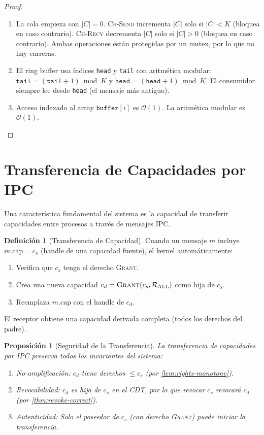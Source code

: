 \documentclass[11pt,twoside,openright]{book}
\theoremstyle{definition}
\newtheorem{definition}{Definición}[chapter]
\theoremstyle{plain}
\newtheorem{proposition}[theorem]{Proposición}
\theoremstyle{remark}
\newcommand{\bigO}{\mathcal{O}}
\newcommand{\rights}{\mathcal{R}}
\newcommand{\rightsall}{\rights_{\mathrm{ALL}}}
\begin{document}
\begin{proof}
\leavevmode
\begin{enumerate}
    \item La cola empieza con $|C| = 0$. \textsc{Ch-Send} incrementa $|C|$ solo si
          $|C| < K$ (bloquea en caso contrario). \textsc{Ch-Recv} decrementa $|C|$ solo
          si $|C| > 0$ (bloquea en caso contrario). Ambas operaciones están protegidas
          por un mutex, por lo que no hay carreras.
    \item El ring buffer usa índices \texttt{head} y \texttt{tail} con aritmética modular:
          $\texttt{tail} = (\texttt{tail} + 1) \bmod K$ y
          $\texttt{head} = (\texttt{head} + 1) \bmod K$. El consumidor siempre lee
          desde \texttt{head} (el mensaje más antiguo).
    \item Acceso indexado al array $\texttt{buffer}[i]$ es $\bigO(1)$. La aritmética
          modular es $\bigO(1)$.
\end{enumerate}
\end{proof}

\section{Transferencia de Capacidades por IPC}

Una característica fundamental del sistema es la capacidad de transferir capacidades
entre procesos a través de mensajes IPC.

\begin{definition}[Transferencia de Capacidad]
\label{def:cap-transfer}
Cuando un mensaje $m$ incluye $m.\text{cap} = c_s$ (handle de una capacidad fuente), el
kernel automáticamente:
\begin{enumerate}
    \item Verifica que $c_s$ tenga el derecho \textsc{Grant}.
    \item Crea una nueva capacidad $c_d = \textsc{Grant}(c_s, \rightsall)$ como hija de $c_s$.
    \item Reemplaza $m.\text{cap}$ con el handle de $c_d$.
\end{enumerate}
El receptor obtiene una capacidad derivada completa (todos los derechos del padre).
\end{definition}

\begin{proposition}[Seguridad de la Transferencia]
\label{prop:transfer-security}
La transferencia de capacidades por IPC preserva todos los invariantes del sistema:
\begin{enumerate}
    \item \emph{No-amplificación}: $c_d$ tiene derechos $\leq c_s$ (por \cref{lem:rights-monotone}).
    \item \emph{Revocabilidad}: $c_d$ es hija de $c_s$ en el CDT, por lo que revocar $c_s$
          revocará $c_d$ (por \cref{thm:revoke-correct}).
    \item \emph{Autenticidad}: Solo el poseedor de $c_s$ (con derecho \textsc{Grant})
          puede iniciar la transferencia.
\end{enumerate}
\end{proposition}
\end{document}
